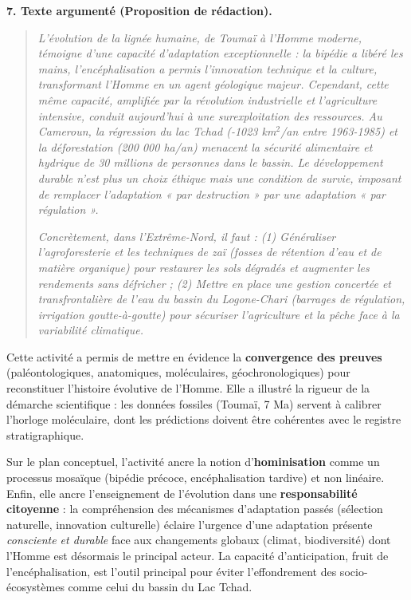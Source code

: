 \documentclass[11pt]{article}
\newcounter{popsec}
\newcounter{popsub}
\newcommand{\courssub}[1]{%
  \stepcounter{popsub}%
  \par\vspace{9pt}\noindent{\popxbold\fontsize{11.5}{13}\selectfont\color{popink}{\color{poporange}\thepopsec.\thepopsub}\hspace{6pt}#1}\par\nopagebreak\vspace{4pt}
}
\begin{document}
\begin{exoresolu}
\textbf{7. Texte argumenté (Proposition de rédaction).}
\begin{quote}
\emph{L'évolution de la lignée humaine, de Toumaï à l'Homme moderne, témoigne d'une capacité d'adaptation exceptionnelle : la bipédie a libéré les mains, l'encéphalisation a permis l'innovation technique et la culture, transformant l'Homme en un agent géologique majeur. Cependant, cette même capacité, amplifiée par la révolution industrielle et l'agriculture intensive, conduit aujourd'hui à une surexploitation des ressources. Au Cameroun, la régression du lac Tchad (-1023 km$^2$/an entre 1963-1985) et la déforestation (200 000 ha/an) menacent la sécurité alimentaire et hydrique de 30 millions de personnes dans le bassin. Le développement durable n'est plus un choix éthique mais une condition de survie, imposant de remplacer l'adaptation « par destruction » par une adaptation « par régulation ». }

\emph{Concrètement, dans l'Extrême-Nord, il faut : (1) Généraliser l'agroforesterie et les techniques de zaï (fosses de rétention d'eau et de matière organique) pour restaurer les sols dégradés et augmenter les rendements sans défricher ; (2) Mettre en place une gestion concertée et transfrontalière de l'eau du bassin du Logone-Chari (barrages de régulation, irrigation goutte-à-goutte) pour sécuriser l'agriculture et la pêche face à la variabilité climatique.}
\end{quote}
\end{exoresolu}

\courssub{Bilan de l'activité}
Cette activité a permis de mettre en évidence la \textbf{convergence des preuves} (paléontologiques, anatomiques, moléculaires, géochronologiques) pour reconstituer l'histoire évolutive de l'Homme. Elle a illustré la rigueur de la démarche scientifique : les données fossiles (Toumaï, 7 Ma) servent à calibrer l'horloge moléculaire, dont les prédictions doivent être cohérentes avec le registre stratigraphique. 

Sur le plan conceptuel, l'activité ancre la notion d'\textbf{hominisation} comme un processus mosaïque (bipédie précoce, encéphalisation tardive) et non linéaire. Enfin, elle ancre l'enseignement de l'évolution dans une \textbf{responsabilité citoyenne} : la compréhension des mécanismes d'adaptation passés (sélection naturelle, innovation culturelle) éclaire l'urgence d'une adaptation présente \emph{consciente et durable} face aux changements globaux (climat, biodiversité) dont l'Homme est désormais le principal acteur. La capacité d'anticipation, fruit de l'encéphalisation, est l'outil principal pour éviter l'effondrement des socio-écosystèmes comme celui du bassin du Lac Tchad.
\end{document}
